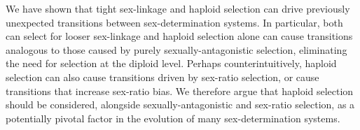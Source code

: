 \documentclass[12pt]{article}
\begin{document}
We have shown that tight sex-linkage and haploid selection can drive previously unexpected transitions between sex-determination systems.
In particular, both can select for looser sex-linkage and haploid selection alone can cause transitions analogous to those caused by purely sexually-antagonistic selection, eliminating the need for selection at the diploid level.
Perhaps counterintuitively, haploid selection can also cause transitions driven by sex-ratio selection, or cause transitions that increase sex-ratio bias. 
We therefore argue that haploid selection should be considered, alongside sexually-antagonistic and sex-ratio selection, as a potentially pivotal factor in the evolution of many sex-determination systems. 

\end{document}
